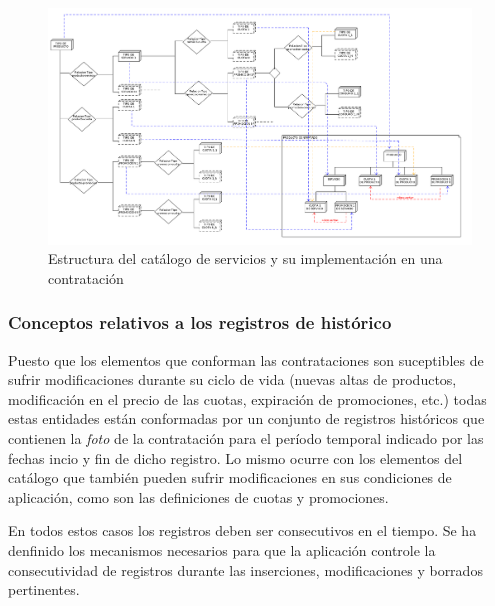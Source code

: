 \begin{figure}[H]
  \centering
  \includegraphics[width=\textwidth]{imaxes/estructura-catalogo.png}
  \caption{Estructura del catálogo de servicios y su implementación en una contratación}
  \label{fig:estructura-catalogo-chap-teoria}
\end{figure}





\subsubsection{Conceptos relativos a los registros de histórico}
\label{sub:histórico-conceptos-chap-teoria}

Puesto que los elementos que conforman las contrataciones son suceptibles de sufrir modificaciones durante su ciclo de vida (nuevas altas de productos, modificación en el precio de las cuotas, expiración de promociones, etc.) todas estas entidades están conformadas por un conjunto de registros históricos que contienen la \textit{foto} de la contratación para el período temporal indicado por las fechas incio y fin de dicho registro. Lo mismo ocurre con los elementos del catálogo que también pueden sufrir modificaciones en sus condiciones de aplicación, como son las definiciones de cuotas y promociones.

En todos estos casos los registros deben ser consecutivos en el tiempo. Se ha denfinido los mecanismos necesarios para que la aplicación controle la consecutividad de registros durante las inserciones, modificaciones y borrados pertinentes.